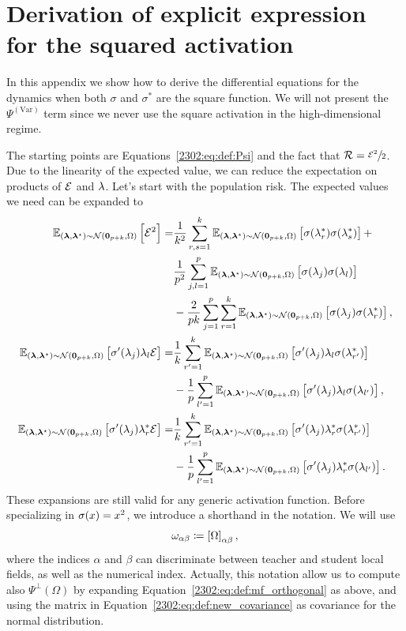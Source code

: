 \section{Derivation of explicit expression for the squared activation}

\label{2302:sec:app:squared}
In this appendix we show how to derive the differential equations for the dynamics when both \(\sigma\) and \(\sigma^*\) are the square function. We will not present the \(\Psi^{(\mathrm{Var})}\) term since we never use the square activation in the high-dimensional regime.

The starting points are Equations~\eqref{2302:eq:def:Psi} and the fact that \(\mathcal{R}=\sfrac{\mathcal{E}^2}{2}\). 
Due to the linearity of the expected value, we can reduce the expectation on products of \(\dsp\) and \(\lf\).
Let's start with the population risk. The expected values we need can be expanded to 
\[\begin{split}
  \Explf \left[  \dsp^2  \right]  =&
    \frac{1}{k^2} \sum_{r, s =1}^k \Explf\left[ \act(\lf_{r}^*) \act(\lf_{s}^*)  \right] +
  \\
  & \frac{1}{p^2} \sum_{j, l =1}^p \Explf\left[ \act(\lf_{j}) \act(\lf_{l}) \right]
  \\
  & - \frac{2}{pk}  \sum_{j=1}^p \sum_{r=1}^k \Explf\left[ \act(\lf_{j}) \act(\lf_{r}^*) \right],
  \\
  \Explf \left[ \act' (\lf_{j})  \lf_{l} \dsp \right]  =&  
  \frac{1}{k} \sum_{r' =1}^{k} \Explf  \left[\act' (\lf_{j}) \lf_l \act( \lf_{r'}^{*}  )  \right]
   \\
   &  -  \frac{1}{p} \sum_{l' = 1}^{p} \Explf \left[ \act' (\lf_{j}) \lf_l   \act ( \lf_{l'}  ) \right]  , 
  \\
   \Explf   \left[\act' (\lf_{j}) \lf_{r}^* \dsp \right]  =&    \frac{1}{k} \sum_{r'=1}^{k}   \Explf   \left[\act' (\lf_{j}) \lf_{r}^* \act( \lf_{r'}^{*}  )  \right]
   \\
   &   -   \frac{1}{p} \sum_{l' = 1}^{p} \Explf \left[ \act' (\lf_{j}) \lf_{r}^*   \act ( \lf_{l'}  ) \right]   .
\end{split}\]
These expansions are still valid for any generic activation function.
Before specializing in \(\act(x)=x^2\), we introduce a shorthand in the notation.
We will use \[\omega_{\alpha\beta} \coloneqq \left[\mat{\Omega}\right]_{\alpha\beta},\]
where the indices \(\alpha\) and \(\beta\) can discriminate between teacher and student local fields, as well as the numerical index.
Actually, this notation allow us to compute also \(\Psi^\bot(\Omega)\) by expanding Equation~\eqref{2302:eq:def:mf_orthogonal} as above, and using the matrix in Equation~\eqref{2302:eq:def:new_covariance} as covariance for the normal distribution.

